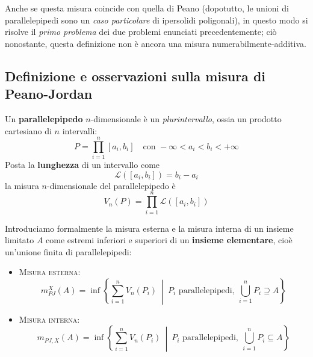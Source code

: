 Anche se questa misura coincide con quella di Peano (dopotutto, le unioni di parallelepipedi sono un \textit{caso particolare} di ipersolidi poligonali), in questo modo si risolve il \textit{primo problema} dei due problemi enunciati precedentemente; ciò nonostante, questa definizione non è ancora una misura numerabilmente-additiva.
\subsection{Definizione e osservazioni sulla misura di Peano-Jordan}
\begin{define}
	Un \textbf{parallelepipedo} $n$-dimensionale è un \textit{plurintervallo}, ossia un prodotto cartesiano di $n$ intervalli:
	\begin{equation}
		P=\prod_{i=1}^{n}\left[a_i,b_i\right]\quad\text{con }-\infty < a_i < b_i < +\infty
	\end{equation}
	Posta la \textbf{lunghezza} di un intervallo come
		\begin{equation}
			\mathcal{L}\left(\left[a_i,b_i\right]\right)=b_i-a_i
		\end{equation}
		la misura $n$-dimensionale del parallelepipedo è
		\begin{equation}
			V_n(P)=\prod_{i=1}^{n}\mathcal{L}\left(\left[a_i,b_i\right]\right)
		\end{equation}
	\end{define}
	Introduciamo formalmente la misura esterna e la misura interna di un insieme limitato $A$ come estremi inferiori e superiori di un \textbf{insieme elementare}, cioè un'unione finita di parallelepipedi:
	\begin{itemize}
		\item \textsc{Misura esterna}: \begin{equation}
			m_{PJ}^X\left(A\right)=\inf\left\{\sum_{i=1}^{n}V_n\left(P_i\right)\ \middle| \ P_i\text{ parallelepipedi},\ \bigcup_{i=1}^nP_i\supseteq A\right\}
		\end{equation}
		\item \textsc{Misura interna}:
		\begin{equation}
			m_{PJ,X}\left(A\right)=\inf\left\{\sum_{i=1}^{n}V_n\left(P_i\right) \ \middle| \  P_i\text{ parallelepipedi},\ \bigcup_{i=1}^nP_i\subseteq A\right\}
		\end{equation}
	\end{itemize}
